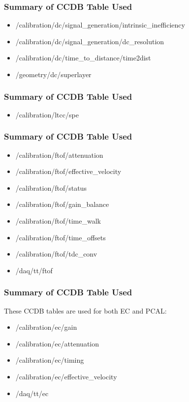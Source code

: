 \subsubsection{Summary of CCDB Table Used}
\begin{itemize}
\item /calibration/dc/signal\_generation/intrinsic\_inefficiency
\item /calibration/dc/signal\_generation/dc\_resolution
\item /calibration/dc/time\_to\_distance/time2dist
\item /geometry/dc/superlayer
\end{itemize}


\subsubsection{Summary of CCDB Table Used}

\begin{itemize}
\item /calibration/ltcc/spe
\end{itemize}


\subsubsection{Summary of CCDB Table Used}
\begin{itemize}
\item /calibration/ftof/attenuation
\item /calibration/ftof/effective\_velocity
\item /calibration/ftof/status
\item /calibration/ftof/gain\_balance
\item /calibration/ftof/time\_walk
\item /calibration/ftof/time\_offsets
\item /calibration/ftof/tdc\_conv
\item /daq/tt/ftof
\end{itemize}

\subsubsection{Summary of CCDB Table Used}

These CCDB tables are used for both EC and PCAL:

\begin{itemize}
\item /calibration/ec/gain
\item /calibration/ec/attenuation
\item /calibration/ec/timing
\item /calibration/ec/effective\_velocity
\item /daq/tt/ec
\end{itemize}



































